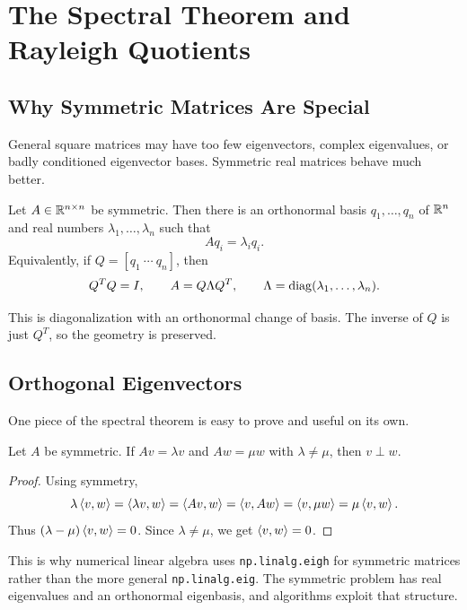 \chapter{The Spectral Theorem and Rayleigh Quotients}
\label{ch:spectral-theorem-rayleigh}

\section{Why Symmetric Matrices Are Special}

General square matrices may have too few eigenvectors, complex eigenvalues, or
badly conditioned eigenvector bases. Symmetric real matrices behave much
better.

\begin{theorem}
Let $A\in\mathbb{R}^{n\times n}$ be symmetric. Then there is an orthonormal basis
$q_1,\ldots,q_n$ of $\mathbb{R}^n$ and real numbers
$\lambda_1,\ldots,\lambda_n$ such that
\[
  Aq_i=\lambda_i q_i.
\]
Equivalently, if $Q=[q_1\ \cdots\ q_n]$, then
\[
  Q^TQ=I,
  \qquad
  A=Q\Lambda Q^T,
  \qquad
  \Lambda=\operatorname{diag}(\lambda_1,\ldots,\lambda_n).
\]
\end{theorem}

This is diagonalization with an orthonormal change of basis. The inverse of
$Q$ is just $Q^T$, so the geometry is preserved.

\section{Orthogonal Eigenvectors}

One piece of the spectral theorem is easy to prove and useful on its own.

\begin{proposition}
Let $A$ be symmetric. If $Av=\lambda v$ and $Aw=\mu w$ with
$\lambda\neq \mu$, then $v\perp w$.
\end{proposition}

\begin{proof}
Using symmetry,
\[
  \lambda\left\langle v,w \right\rangle
  =
  \left\langle \lambda v,w \right\rangle
  =
  \left\langle Av,w \right\rangle
  =
  \left\langle v,Aw \right\rangle
  =
  \left\langle v,\mu w \right\rangle
  =
  \mu\left\langle v,w \right\rangle.
\]
Thus $(\lambda-\mu)\left\langle v,w \right\rangle=0$. Since $\lambda\neq\mu$, we get
$\left\langle v,w \right\rangle=0$.
\end{proof}

\begin{computebox}
This is why numerical linear algebra uses \texttt{np.linalg.eigh} for
symmetric matrices rather than the more general \texttt{np.linalg.eig}. The
symmetric problem has real eigenvalues and an orthonormal eigenbasis, and
algorithms exploit that structure.
\end{computebox}

